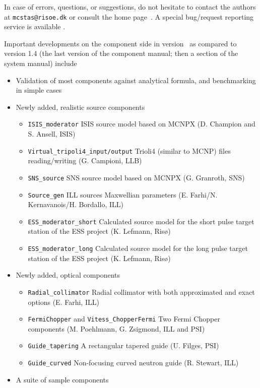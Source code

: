 In case of errors, questions, or suggestions,
do not hesitate to
contact the authors at \verb+mcstas@risoe.dk+
or consult the \MCS home page~\cite{mcstas_webpage}. A special bug/request reporting service is available \cite{mczilla_webpage}.

Important developments on the component side in \MCS version \version\
as compared to version 1.4 (the last version of the component manual;
then a section of the system manual) include

\begin{itemize}
\item{Validation of most components against analytical formula,
and benchmarking in simple cases}
\item{Newly added, realistic source components}
  \begin{itemize}
  \item \verb+ISIS_moderator+ ISIS source model based on MCNPX (D. Champion and S. Ansell, ISIS)
  \item \verb+Virtual_tripoli4_input/output+ Trioli4 (similar to MCNP) files reading/writing (G. Campioni, LLB)
  \item \verb+SNS_source+ SNS source model based on MCNPX (G. Granroth, SNS)
  \item \verb+Source_gen+ ILL sources Maxwellian parameters (E. Farhi/N. Kernavanois/H. Bordallo, ILL)
  \item \verb+ESS_moderator_short+ Calculated source model for the short pulse target station of the ESS project (K. Lefmann, Ris\o )
  \item \verb+ESS_moderator_long+ Calculated source model for the long pulse target station of the ESS project (K. Lefmann, Ris\o )
  \end{itemize}
\item{Newly added, optical components}
  \begin{itemize}
  \item \verb+Radial_collimator+ Radial collimator with both approximated and exact options (E. Farhi, ILL)
  \item \verb+FermiChopper+ and \verb+Vitess_ChopperFermi+ Two Fermi Chopper components (M. Poehlmann, G. Zsigmond, ILL and PSI)
  \item \verb+Guide_tapering+ A rectangular tapered guide (U. Filges, PSI)
  \item \verb+Guide_curved+  Non-focusing curved neutron guide (R. Stewart, ILL)
  \end{itemize}
\item{A suite of sample components}

\end{itemize}
